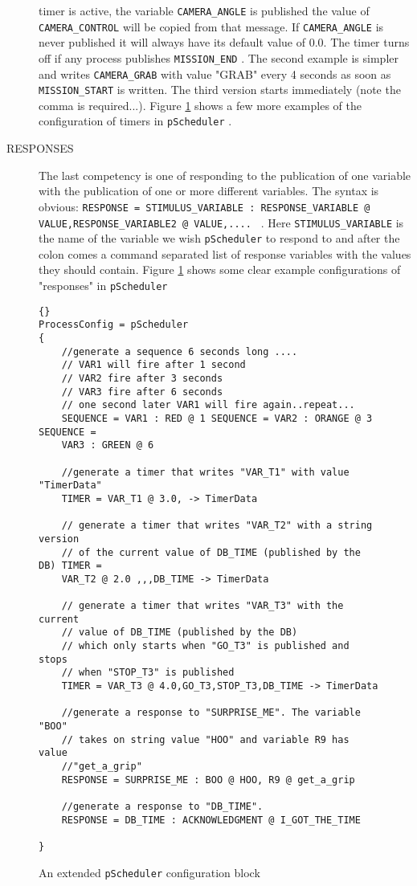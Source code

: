 \documentclass[a4paper,10pt]{article}
\newcommand{\Code}[1]{\texttt{#1} }
\newcommand{\code}[1]{\Code{#1} }
\begin{document}
\begin{description}
timer is active, the variable \code{CAMERA\_ANGLE} is published
the value of \code{CAMERA\_CONTROL} will be copied from that
message. If \code{CAMERA\_ANGLE} is never published it will always
have its default value of $0.0$. The timer turns off if any
process publishes \code{MISSION\_END}. The second example is
simpler and writes \code{CAMERA\_GRAB} with value "GRAB" every 4
seconds as soon as \code{MISSION\_START} is written. The third
version starts immediately (note the comma is required...). Figure
\ref{Fig:SchedulerExt} shows a few more examples of the
configuration of timers in  \code{pScheduler}.
\item[RESPONSES] The last competency is one of responding to the
publication of one variable with the publication of one or more
different variables. The syntax is obvious: \code{RESPONSE =
STIMULUS\_VARIABLE : RESPONSE\_VARIABLE @
VALUE,RESPONSE\_VARIABLE2 @ VALUE,....  }. Here
\code{STIMULUS\_VARIABLE} is the name of the variable we wish
\code{pScheduler} to respond to and after the colon comes a
command separated list of response variables with the values they
should contain. Figure \ref{Fig:SchedulerExt} shows some clear
example configurations of "responses" in \code{pScheduler}
\end{description}

\begin{figure}
\label{Fig:SchedulerExt}
\begin{lstlisting}[]{}
ProcessConfig = pScheduler
{
    //generate a sequence 6 seconds long ....
    // VAR1 will fire after 1 second
    // VAR2 fire after 3 seconds
    // VAR3 fire after 6 seconds
    // one second later VAR1 will fire again..repeat...
    SEQUENCE = VAR1 : RED @ 1 SEQUENCE = VAR2 : ORANGE @ 3 SEQUENCE =
    VAR3 : GREEN @ 6

    //generate a timer that writes "VAR_T1" with value "TimerData"
    TIMER = VAR_T1 @ 3.0, -> TimerData

    // generate a timer that writes "VAR_T2" with a string version
    // of the current value of DB_TIME (published by the DB) TIMER =
    VAR_T2 @ 2.0 ,,,DB_TIME -> TimerData

    // generate a timer that writes "VAR_T3" with the current
    // value of DB_TIME (published by the DB)
    // which only starts when "GO_T3" is published and stops
    // when "STOP_T3" is published
    TIMER = VAR_T3 @ 4.0,GO_T3,STOP_T3,DB_TIME -> TimerData

    //generate a response to "SURPRISE_ME". The variable "BOO"
    // takes on string value "HOO" and variable R9 has value
    //"get_a_grip"
    RESPONSE = SURPRISE_ME : BOO @ HOO, R9 @ get_a_grip

    //generate a response to "DB_TIME".
    RESPONSE = DB_TIME : ACKNOWLEDGMENT @ I_GOT_THE_TIME

}
\end{lstlisting}\caption{An extended \code{pScheduler} configuration block}
\end{figure}
\end{document}
